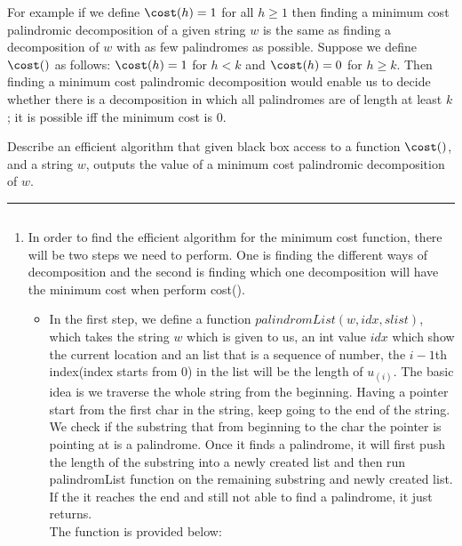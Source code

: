 \documentclass[11pt]{article}
\begin{document}
\begin{enumerate}
For example if we define $\cost(h) = 1$ for all $h \ge 1$ then finding
a minimum cost palindromic decomposition of a given string $w$ is the
same as finding a decomposition of $w$ with as few palindromes as
possible. Suppose we define $\cost()$ as follows: $\cost(h) = 1$
for $h < k$ and $\cost(h) = 0$ for $h \ge k$. Then finding a
minimum cost palindromic decomposition would enable us to decide
whether there is a decomposition in which all palindromes are
of length at least $k$; it is possible iff the minimum cost is $0$.

Describe an efficient algorithm that given  black box access to
a function $\cost()$, and a string $w$, outputs the
value of a minimum cost palindromic decomposition of $w$.
\end{enumerate}

\hrule
\begin{solution}
$$ $$
\begin{enumerate}
    \item 
        In order to find the efficient algorithm for the minimum cost function, there will be two steps we need to perform. One is finding the different ways of decomposition and the second is finding which one decomposition will have the minimum cost when perform cost(). 
        \begin{itemize}
            \item  
            In the first step, we define a function $palindromList(w, idx, slist)$, which takes the string $w$ which is given to us, an int value $idx$ which show the current location and an list that is a sequence of number, the $i-1$th index(index starts from 0) in the list will be the length of $u_{(i)}$. 
            \newline
            The basic idea is we traverse the whole string from the beginning. Having a pointer start from the first char in the string, keep going to the end of the string. 
            \newline 
            We check if the substring that from beginning to the char the pointer is pointing at is a palindrome. Once it finds a palindrome, it will first push the length of the substring into a newly created list and then run palindromList function on the remaining substring and newly created list. If the it reaches the end and still not able to find a palindrome, it just returns. 
            $$ $$
            The function is provided below:
            \begin{quote}
                \newline

\end{quote}
\end{itemize}
\end{enumerate}
\end{solution}
\end{document}
